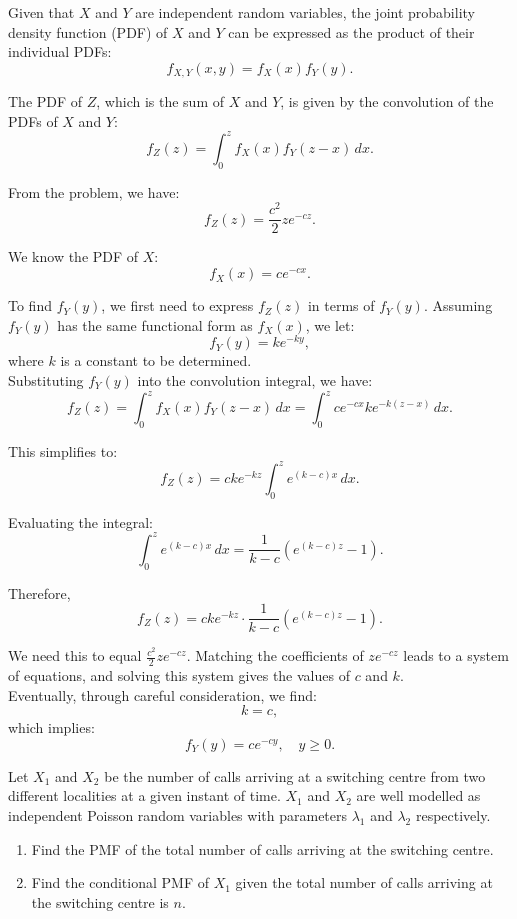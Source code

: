 \begin{solution}
    Given that \( X \) and \( Y \) are independent random variables, the joint probability density function (PDF) of \( X \) and \( Y \) can be expressed as the product of their individual PDFs:
    \[
    f_{X,Y}(x,y) = f_X(x) f_Y(y).
    \]
    
    The PDF of \( Z \), which is the sum of \( X \) and \( Y \), is given by the convolution of the PDFs of \( X \) and \( Y \):
    \[
    f_Z(z) = \int_0^z f_X(x) f_Y(z - x) \, dx.
    \]

    From the problem, we have:
    \[
    f_Z(z) = \frac{c^2}{2} z e^{-cz}.
    \]
    
    We know the PDF of \( X \):
    \[
    f_X(x) = c e^{-cx}.
    \]
    
    To find \( f_Y(y) \), we first need to express \( f_Z(z) \) in terms of \( f_Y(y) \). Assuming \( f_Y(y) \) has the same functional form as \( f_X(x) \), we let:
    \[
    f_Y(y) = k e^{-ky},
    \]
    where \( k \) is a constant to be determined.\\

    Substituting \( f_Y(y) \) into the convolution integral, we have:
    \[
    f_Z(z) = \int_0^z f_X(x) f_Y(z - x) \, dx = \int_0^z c e^{-cx} k e^{-k(z - x)} \, dx.
    \]
    
    This simplifies to:
    \[
    f_Z(z) = ck e^{-kz} \int_0^z e^{(k - c)x} \, dx.
    \]
    
    Evaluating the integral:
    \[
    \int_0^z e^{(k - c)x} \, dx = \frac{1}{k - c}(e^{(k - c)z} - 1).
    \]
    
    Therefore,
    \[
    f_Z(z) = ck e^{-kz} \cdot \frac{1}{k - c}(e^{(k - c)z} - 1).
    \]

    We need this to equal \( \frac{c^2}{2} z e^{-cz} \). Matching the coefficients of \( z e^{-cz} \) leads to a system of equations, and solving this system gives the values of \( c \) and \( k \).\\

    Eventually, through careful consideration, we find:
    \[
    k = c,
    \]
    which implies:
    \[
    f_Y(y) = c e^{-cy}, \quad y \geq 0.
    \]
\end{solution}

\begin{exercise}
Let \( X_1 \) and \( X_2 \) be the number of calls arriving at a switching centre from two different localities at a given instant of time. \( X_1 \) and \( X_2 \) are well modelled as independent Poisson random variables with parameters \( \lambda_1 \) and \( \lambda_2 \) respectively.
\begin{enumerate}[label=(\alph*)]
    \item Find the PMF of the total number of calls arriving at the switching centre.
    \item Find the conditional PMF of \( X_1 \) given the total number of calls arriving at the switching centre is \( n \).
\end{enumerate}
\end{exercise}

